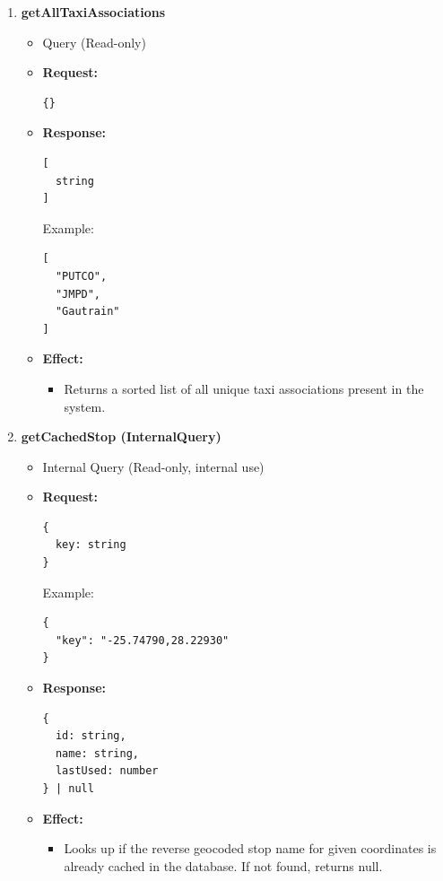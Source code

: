 \documentclass[a4paper,12pt]{article}
\begin{document}
\begin{enumerate}
  \item \textbf{getAllTaxiAssociations}
    \begin{itemize}
      \item Query (Read-only)
      \item \textbf{Request:}
      \begin{verbatim}
{}
      \end{verbatim}
      \item \textbf{Response:}
      \begin{verbatim}
[
  string
]
      \end{verbatim}
      Example:
      \begin{verbatim}
[
  "PUTCO",
  "JMPD",
  "Gautrain"
]
      \end{verbatim}
      \item \textbf{Effect:}
      \begin{itemize}
        \item Returns a sorted list of all unique taxi associations present in the system.
      \end{itemize}
    \end{itemize}

  \item \textbf{getCachedStop (InternalQuery)}
    \begin{itemize}
      \item Internal Query (Read-only, internal use)
      \item \textbf{Request:}
      \begin{verbatim}
{
  key: string
}
      \end{verbatim}
      Example:
      \begin{verbatim}
{
  "key": "-25.74790,28.22930"
}
      \end{verbatim}
      \item \textbf{Response:}
      \begin{verbatim}
{
  id: string,
  name: string,
  lastUsed: number
} | null
      \end{verbatim}
      \item \textbf{Effect:}
      \begin{itemize}
        \item Looks up if the reverse geocoded stop name for given coordinates is already cached in the database. If not found, returns null.
      \end{itemize}
    \end{itemize}


\end{enumerate}
\end{document}
